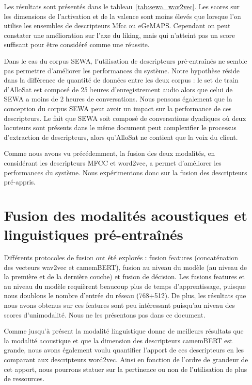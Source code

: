 

Les résultats sont présentés dans le tableau~\ref{tab:sewa_wav2vec}. Les scores sur les dimensions de l'activation et de la valence sont moins élevés que lorsque l'on utilise les ensembles de descripteurs Mfcc ou eGeMAPS. Cependant on peut constater une amélioration sur l'axe du liking, mais qui n'atteint pas un score suffisant pour être considéré comme une réussite.

Dans le cas du corpus SEWA, l'utilisation de descripteurs pré-entraînés ne semble pas permettre d'améliorer les performances du système. Notre hypothèse réside dans la différence de quantité de données entre les deux corpus : le set de train d'AlloSat est composé de 25 heures d'enregistrement audio alors que celui de SEWA a moins de 2 heures de conversations. %
Nous pensons également que la conception du corpus SEWA peut avoir un impact sur la performance de ces descripteurs. Le fait que SEWA soit composé de conversations dyadiques où deux locuteurs sont présents dans le même document peut complexifier le processus d'extraction de descripteurs, alors qu'AlloSat ne contient que la voix du client.

Comme nous avons vu précédemment, la fusion des deux modalités, en considérant les descripteurs MFCC et word2vec, a permet d'améliorer les performances du système. Nous expérimentons donc sur la fusion des descripteurs pré-appris.

\section{Fusion des modalités acoustiques et linguistiques pré-entraînés}
Différents protocoles de fusion ont été explorés : fusion features (concaténation des vecteurs wav2vec et camemBERT), fusion au niveau du modèle (au niveau de la première et de la dernière couche) et fusion de décision. Les fusions features et au niveau du modèle requièrent beaucoup plus de temps d'apprentissage, puisque nous doublons le nombre d'entrée du réseau (768+512). De plus, les résultats que nous avons obtenus sur ces features sont peu intéressant puisqu'au niveau des scores d'unimodalité. Nous ne les présentons pas dans ce document.

Comme jusqu'à présent la modalité linguistique donne de meilleurs résultats que la modalité acoustique et que la dimension des descripteurs camemBERT est grande, nous avons également voulu quantifier l'apport de ces descripteurs en les comparant aux descripteurs word2vec. Ainsi en fonction de l'ordre de grandeur de cet apport, nous pourrons statuer sur la pertinence ou non de l'utilisation de plus de ressources.

